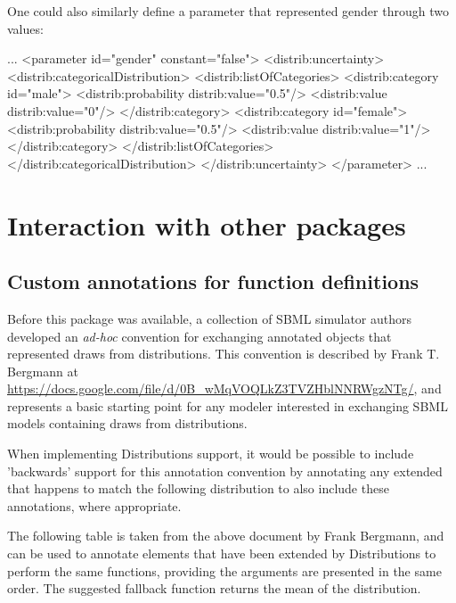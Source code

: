 \documentclass[draftspec]{sbmlpkgspec}
\newcommand{\distrib}{Distributions\xspace}
\begin{document}
One could also similarly define a parameter that represented gender through two values:

\begin{example}
...
      <parameter id="gender" constant="false">
        <distrib:uncertainty>
          <distrib:categoricalDistribution>
            <distrib:listOfCategories>
              <distrib:category id="male">
                <distrib:probability distrib:value="0.5"/>
                <distrib:value distrib:value="0"/>
              </distrib:category>
              <distrib:category id="female">
                <distrib:probability distrib:value="0.5"/>
                <distrib:value distrib:value="1"/>
              </distrib:category>
            </distrib:listOfCategories>
          </distrib:categoricalDistribution>
        </distrib:uncertainty>
      </parameter>
...
\end{example}


\section{Interaction with other packages}

\subsection{Custom annotations for function definitions}
\label{sec:annotation-scheme}
Before this package was available, a collection of SBML simulator authors developed an \emph{ad-hoc} convention for exchanging annotated \FunctionDefinition objects that represented draws from distributions.  This convention is described by Frank T. Bergmann at \url{https://docs.google.com/file/d/0B_wMqVOQLkZ3TVZHblNNRWgzNTg/}, and represents a basic starting point for any modeler interested in exchanging SBML models containing draws from distributions.

When implementing \distrib support, it would be possible to include 'backwards' support for this annotation convention by annotating any extended \FunctionDefinition that happens to match the following distribution to also include these annotations, where appropriate.

The following table is taken from the above document by Frank Bergmann, and can be used to annotate \FunctionDefinition elements that have been extended by \distrib to perform the same functions, providing the arguments are presented in the same order.  The suggested fallback function returns the mean of the distribution.
\end{document}
